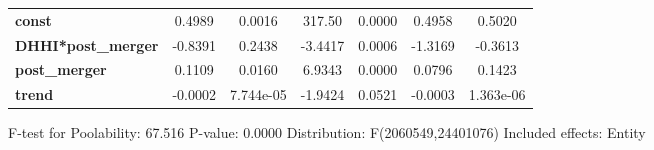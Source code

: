 \documentclass{report}
\begin{document}
\begin{center}
\begin{tabular}{lcccccc}
\midrule
\textbf{const}             &       0.4989       &       0.0016       &      317.50     &      0.0000      &       0.4958      &       0.5020       \\
\textbf{DHHI*post\_merger} &      -0.8391       &       0.2438       &     -3.4417     &      0.0006      &      -1.3169      &      -0.3613       \\
\textbf{post\_merger}      &       0.1109       &       0.0160       &      6.9343     &      0.0000      &       0.0796      &       0.1423       \\
\textbf{trend}             &      -0.0002       &     7.744e-05      &     -1.9424     &      0.0521      &      -0.0003      &     1.363e-06      \\
\bottomrule
\end{tabular}
\end{center}

F-test for Poolability: 67.516 \newline
 P-value: 0.0000 \newline
 Distribution: F(2060549,24401076) \newline
  \newline
 Included effects: Entity
\end{document}
